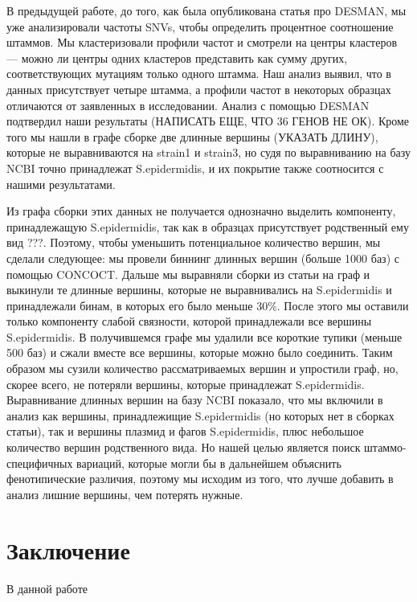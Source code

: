 \documentclass{spbau-diploma}
\begin{document}
В предыдущей работе, до того, как была опубликована статья про DESMAN, мы уже анализировали частоты SNVs, чтобы определить процентное соотношение штаммов. Мы кластеризовали профили частот и смотрели на центры кластеров --- можно ли центры одних кластеров представить как сумму других, соответствующих мутациям только одного штамма. Наш анализ выявил, что в данных присутствует четыре штамма, а профили частот в некоторых образцах отличаются от заявленных в исследовании. Анализ с помощью DESMAN подтвердил наши результаты (НАПИСАТЬ ЕЩЕ, ЧТО 36 ГЕНОВ НЕ ОК). Кроме того мы нашли в графе сборке две длинные вершины (УКАЗАТЬ ДЛИНУ), которые не выравниваются на strain1 и strain3, но судя по выравниванию на базу NCBI точно принадлежат S.epidermidis, и их покрытие также соотносится с нашими результатами.

Из графа сборки этих данных не получается однозначно выделить компоненту, принадлежащую S.epidermidis, так как в образцах присутствует родственный ему вид ???. Поэтому, чтобы уменьшить потенциальное количество вершин, мы сделали следующее: мы провели биннинг длинных вершин (больше 1000 баз) с помощью CONCOCT. Дальше мы выравняли сборки из статьи на граф и выкинули те длинные вершины, которые не выравнивались на S.epidermidis и принадлежали бинам, в которых его было меньше 30\%. После этого мы оставили только компоненту слабой связности, которой принадлежали все вершины S.epidermidis. В получившемся графе мы удалили все короткие тупики (меньше 500 баз) и сжали вместе все вершины, которые можно было соединить. Таким образом мы сузили количество рассматриваемых вершин и упростили граф, но, скорее всего, не потеряли вершины, которые принадлежат S.epidermidis. Выравнивание длинных вершин на базу NCBI показало, что мы включили в анализ как вершины, принадлежищие S.epidermidis (но которых нет в сборках статьи), так и вершины плазмид и фагов S.epidermidis, плюс небольшое количество вершин родственного вида. Но нашей целью является поиск штаммо-специфичных вариаций, которые могли бы в дальнейшем объяснить фенотипические различия, поэтому мы исходим из того, что лучше добавить в анализ лишние вершины, чем потерять нужные.




\section*{Заключение}
В данной работе
\end{document}
